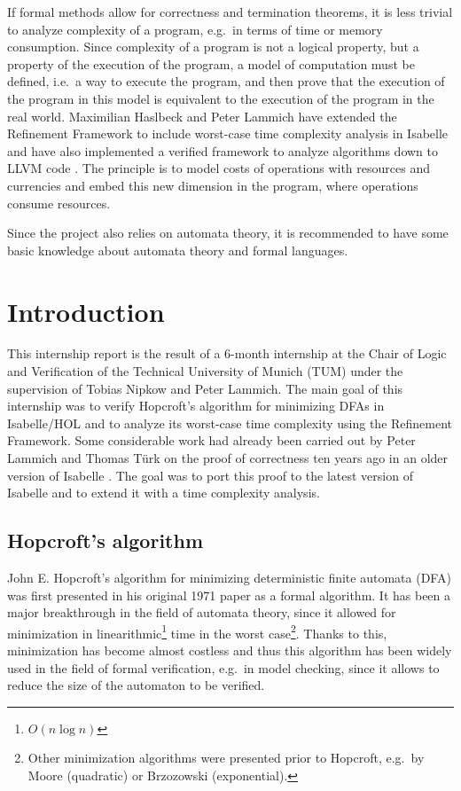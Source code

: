 \documentclass[12pt, a4 paper]{article}
\theoremstyle{definition}
\begin{document}
\bigskip

If formal methods allow for correctness and termination theorems, it is less trivial to analyze complexity of a program, e.g.\ in terms of time or memory consumption. Since complexity of a program is not a logical property, but a property of the execution of the program, a model of computation must be defined, i.e.\ a way to execute the program, and then prove that the execution of the program in this model is equivalent to the execution of the program in the real world. Maximilian Haslbeck and Peter Lammich have extended the Refinement Framework to include worst-case time complexity analysis in Isabelle \cite{refwithtime} and have also implemented a verified framework to analyze algorithms down to LLVM code \cite{fewdollarsmore}. The principle is to model costs of operations with resources and currencies and embed this new dimension in the program, where operations consume resources.

\bigskip

Since the project also relies on automata theory, it is recommended to have some basic knowledge about automata theory and formal languages.

\section{Introduction}

This internship report is the result of a 6-month internship at the Chair of Logic and Verification of the Technical University of Munich (TUM) under the supervision of Tobias Nipkow and Peter Lammich. The main goal of this internship was to verify Hopcroft's algorithm for minimizing DFAs in Isabelle/HOL and to analyze its worst-case time complexity using the Refinement Framework. Some considerable work had already been carried out by Peter Lammich and Thomas T\"urk on the proof of correctness ten years ago in an older version of Isabelle \cite{lammich:hop}. The goal was to port this proof to the latest version of Isabelle and to extend it with a time complexity analysis.

\subsection{Hopcroft's algorithm}
John E. Hopcroft's algorithm for minimizing deterministic finite automata (DFA) was first presented in his original 1971 paper \cite{Hop71} as a formal algorithm. It has been a major breakthrough in the field of automata theory, since it allowed for minimization in linearithmic\footnote{$O(n \log n)$} time in the worst case\footnote{Other minimization algorithms were presented prior to Hopcroft, e.g.\ by Moore (quadratic) or Brzozowski (exponential).}. Thanks to this, minimization has become almost costless and thus this algorithm has been widely used in the field of formal verification, e.g.\ in model checking, since it allows to reduce the size of the automaton to be verified.
\end{document}
